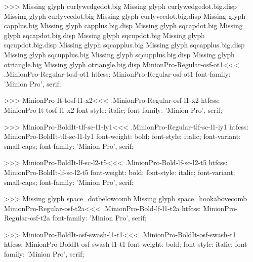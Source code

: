 {>>>
Missing glyph	curlywedgedot.big
Missing glyph	curlywedgedot.big.disp
Missing glyph	curlyveedot.big
Missing glyph	curlyveedot.big.disp
Missing glyph	capplus.big
Missing glyph	capplus.big.disp
Missing glyph	sqcapdot.big
Missing glyph	sqcapdot.big.disp
Missing glyph	sqcupdot.big
Missing glyph	sqcupdot.big.disp
Missing glyph	sqcapplus.big
Missing glyph	sqcapplus.big.disp
Missing glyph	sqcupplus.big
Missing glyph	sqcupplus.big.disp
Missing glyph	otriangle.big
Missing glyph	otriangle.big.disp
\<MinionPro-Regular-osf-ot1\><<<
.MinionPro-Regular-tosf-ot1
htfcss:  MinionPro-Regular-osf-ot1  font-family: 'Minion Pro', serif;

>>>
\<MinionPro-It-tosf-l1-x2\><<<
.MinionPro-Regular-osf-l1-x2
htfcss:  MinionPro-It-tosf-l1-x2  font-style: italic; font-family: 'Minion Pro', serif;

>>>
\<MinionPro-BoldIt-tlf-sc-l1-ly1\><<<
.MinionPro-Regular-tlf-sc-l1-ly1
htfcss:  MinionPro-BoldIt-tlf-sc-l1-ly1  font-weight: bold; font-style: italic; font-variant: small-caps; font-family: 'Minion Pro', serif;

>>>
\<MinionPro-BoldIt-lf-sc-l2-t5\><<<
.MinionPro-Bold-lf-sc-l2-t5
htfcss:  MinionPro-BoldIt-lf-sc-l2-t5  font-weight: bold; font-style: italic; font-variant: small-caps; font-family: 'Minion Pro', serif;

>>>
Missing glyph	space_dotbelowcomb
Missing glyph	space_hookabovecomb
\<MinionPro-Regular-osf-t2a\><<<
.MinionPro-Bold-lf-l1-t2a
htfcss:  MinionPro-Regular-osf-t2a  font-family: 'Minion Pro', serif;

>>>
\<MinionPro-BoldIt-osf-swash-l1-t1\><<<
.MinionPro-BoldIt-osf-swash-t1
htfcss:  MinionPro-BoldIt-osf-swash-l1-t1  font-weight: bold; font-style: italic; font-family: 'Minion Pro', serif;

}
